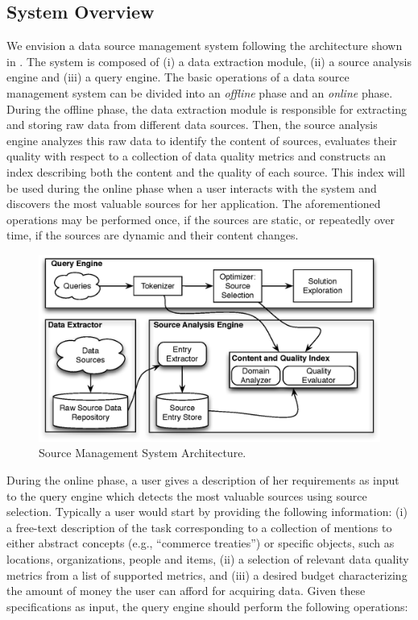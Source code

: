 \documentclass{sig-alternate}
\begin{document}
\subsection{System Overview}
\label{sec:architecture}
We envision a data source management system following the architecture shown in . The system is composed of (i) a data extraction module, (ii) a source analysis engine and (iii) a query engine. The basic operations of a data source management system can be divided into an {\em offline} phase and an {\em online} phase. During the offline phase, the data extraction module is responsible for extracting and storing raw data from different data sources. Then, the source analysis engine analyzes this raw data to identify the content of sources, evaluates their quality with respect to a collection of data quality metrics and constructs an index describing both the content and the quality of each source. This index will be used during the online phase when a user interacts with the system and discovers the most valuable sources for her application. The aforementioned operations may be performed once, if the sources are static, or repeatedly over time, if the sources are dynamic and their content changes. 
\begin{figure}
	\begin{center}
	\includegraphics[clip,scale=0.5]{fig/system.eps}
	\vspace{-20pt}
	\caption{Source Management System Architecture.}
	\label{fig:system}
	\end{center}
	\vspace{-20pt}
\end{figure}
During the online phase, a user gives a description of her requirements as input to the query engine which detects the most valuable sources using source selection. Typically a user would start by providing the following information: (i) a free-text description of the task corresponding to a collection of mentions to either abstract concepts (e.g., ``commerce treaties'') or specific objects, such as locations, organizations, people and items, (ii) a selection of relevant data quality metrics from a list of supported metrics, and (iii) a desired budget characterizing the amount of money the user can afford for acquiring data. Given these specifications as input, the query engine should perform the following operations:
\end{document}
